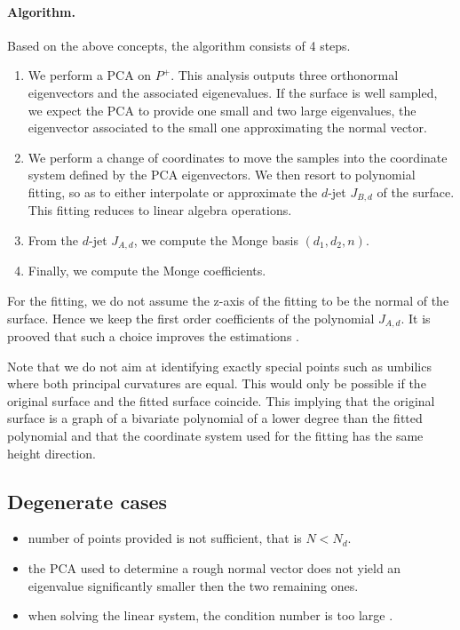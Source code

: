 \paragraph{Algorithm.}
%
Based on the above concepts, the algorithm consists of 4 steps.
%
\begin{enumerate}
\item
We perform a PCA on $P^+$. This analysis outputs three orthonormal
eigenvectors and the associated eigenevalues.  If the
surface is well sampled, we expect the PCA to provide one small and
two large eigenvalues, the eigenvector associated to the small one
approximating the normal vector.
\item
We perform a change of coordinates to move the samples into the
coordinate system defined by the PCA eigenvectors. We then resort to
polynomial fitting, so as to either interpolate or approximate the
$d$-jet $J_{B,d}$ of the surface. This fitting reduces to linear
algebra operations.
\item
From the $d$-jet $J_{A,d}$, we compute the Monge basis $(d_1,d_2,n)$.
\item
Finally, we compute the Monge coefficients.

\end{enumerate}


For the fitting, we do not assume the z-axis of the fitting to
be the normal of the surface. Hence we keep the first order
coefficients of the polynomial $J_{A,d}$. It is prooved that such a choice
improves the estimations \cite{fc-mp-edqpfoj-05}.

Note that we do not aim at identifying exactly special points such as
umbilics where both principal curvatures are equal. This would only be
possible if the original surface and the fitted surface coincide. This
implying that the original surface is a graph of a bivariate
polynomial of a lower degree than the fitted polynomial and that the
coordinate system used for the fitting has the same height direction.


\subsection{Degenerate cases}
\label{sec:deg-cases}



\begin{itemize}
\item
number of points provided is not sufficient, that is $N < N_d$.

\item
the PCA used to determine a rough normal vector does not yield an
eigenvalue significantly smaller then the two remaining ones.

\item
when solving the linear system, the condition number is too large .
\end{itemize}

